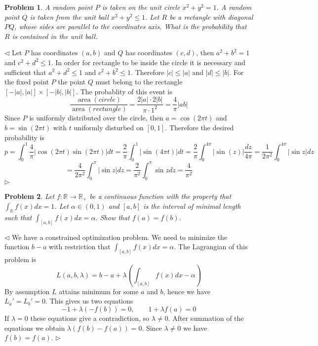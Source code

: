 \documentclass[12pt]{article}
\newtheorem{problem}{Problem}[subsection]
\newenvironment{solution}{\par $\triangleleft$}{$\triangleright$}
\begin{document}
\begin{problem} A random point $P$ is taken on the unit circle $x^2+y^2=1$. A random point $Q$ is taken from the unit ball $x^2+y^2\leq 1$. Let $R$ be a rectangle with diagonal $PQ$, whose sides are parallel to the coordinates axis. What is the probability that $R$ is contained in the unit ball.  
\end{problem}
\begin{solution} Let $P$ has coordinates $(a,b)$ and $Q$ has coordinates $(c,d)$, then $a^2+b^2=1$ and $c^2+d^2\leq 1$. In order for rectangle to be inside the circle it is necessary and sufficient that $a^2+d^2\leq 1$ and $c^2+b^2\leq 1$. Therefore $|c|\leq|a|$ and $|d|\leq |b|$. For the fixed point $P$ the point $Q$ must belong to the rectangle $[-|a|,|a|]\times[-|b|,|b|]$. The probablity of this event is
$$
\frac{\operatorname{area}(circle)}{\operatorname{area}(rectangle)}=\frac{2|a|\cdot2|b|}{\pi \cdot 1^2}=\frac{4}{\pi}|ab|
$$
Since $P$ is uniformly distributed over the circle, then $a=\cos(2\pi t)$ and $b=\sin(2\pi t)$ with $t$ uniformly disturbed on $[0,1]$. Therefore the desired probability is
$$
p
=\int_{0}^{1} \frac{4}{\pi}|\cos(2\pi t)\sin(2\pi t)|dt
=\frac{2}{\pi}\int_{0}^{1} |\sin(4\pi t)|dt
=\frac{2}{\pi}\int_{0}^{4\pi} |\sin(z)|\frac{dz}{4\pi}
=\frac{1}{2\pi^2}\int_0^{4\pi}|\sin z|dz
$$
$$
=\frac{4}{2\pi^2}\int_0^{\pi}|\sin z|dz
=\frac{2}{\pi^2}\int_0^\pi \sin z dz
=\frac{4}{\pi^2}
$$
\end{solution}
 
\begin{problem} Let $f:\mathbb{R}\to\mathbb{R}_+$ be a continuous function with the property that $\int_{\mathbb{R}} f(x)dx=1$. Let $\alpha\in(0,1)$ and $[a,b]$ is  the interval of minimal length such that $\int_{[a,b]} f(x)dx=\alpha$. Show that $f(a)=f(b)$.
\end{problem}
\begin{solution} We have a constrained optimization problem. We need to minimize the function $b-a$ with restriction that $\int_{[a,b]}f(x)dx=\alpha$. The Lagrangian of this problem is
$$
L(a,b,\lambda)=b-a+\lambda\left(\int_{[a,b]}f(x)dx-\alpha\right)
$$
By assumption $L$ attains minimum for some $a$ and $b$, hence we have $L_a'=L_b'=0$. This gives us two equations
$$
-1+\lambda(-f(b))=0,\qquad 1+\lambda f(a)=0
$$
If $\lambda=0$ these equations give a contradiction, so $\lambda\neq 0$. After summation of the equations we obtain $\lambda(f(b)-f(a))=0$. Since $\lambda\neq 0$ we have $f(b)=f(a)$.
\end{solution}
 
\end{document}
